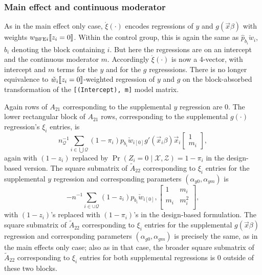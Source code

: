 \documentclass{article}
\DeclarePairedDelimiter{\indicator}{\llbracket}{\rrbracket}
\newcommand{\owt}[1][{[z_{i}]}]{\ensuremath{\check{w}_{i#1}}}
\begin{document}
  \subsubsection{Main effect and continuous moderator}
As in the main effect only case, $\acute{\xi}(\cdot)$ encodes
regressions of $y$ and $g(\vec{x}\beta)$ with weights
$w_{\text{BFE}i}\indicator{z_i=0}$.  Within the control group, this is
again the same as $\hat{p}_{b_i}\owt[]$, $b_i$ denoting the block
containing $i$. But here the regressions are on an
intercept and the continuous moderator $m$. Accordingly
$\acute{\xi}(\cdot)$ is now a 4-vector, with intercept and $m$ terms
for the $y$ and for the $g$ regresssions.  There is no longer
equivalence to $\owt[]\indicator{z_{i}=0}$-weighted regression of $y$
and $g$ on the block-absorbed transformation of the
\texttt{[(Intercept), m]} model matrix.

Again rows of $A_{21}$ corresponding to the supplemental $y$
regression are 0. The lower rectangular block of $A_{21}$ rows,
corresponding to the supplemental $g(\cdot)$ regression's $\xi_{i}$
entries, is
\begin{equation*}
    n_{\mathcal{Q}}^{-1}\sum_{i\in \bigcup\mathcal{Q} }
  (1-\pi_{i}){p}_{b_{{i}}}\owt[{[0]}] g'(\vec{x}_{i}{\beta})
  \vec{x}_{i} \begin{bmatrix}    1 \\ m_{i}  \end{bmatrix}, 
\end{equation*}
again with $(1-z_{i})$ replaced by $\operatorname{Pr}(Z_{i}=0 \mid \mathcal{X}, \mathcal{Z})
= 1-\pi_{i}$ in the design-based version. The square submatrix of
$\tilde{A}_{22}$ corresponding to $\xi_{i}$ entries for the
supplemental $y$ regression and corresponding parameters
$(\alpha_{y0}, \alpha_{y m})$ is
\begin{equation*}
    -n^{-1}\sum_{i \in \cup \mathcal{Q}}
(1-z_{i}){p}_{b_{{i}}}\owt[{[0]}],
\begin{bmatrix}
  1 & m_{i}\\
  m_{i} & m_{i}^{2}\\
\end{bmatrix},
\end{equation*}
with $(1-z_{i})$'s replaced with $(1-\pi_{i})$'s in the design-based
formulation.  The square submatrix of
$\tilde{A}_{22}$ corresponding to $\xi_{i}$ entries for the
supplemental $g(\vec{x}\beta)$ regression and corresponding parameters
$(\alpha_{g0}, \alpha_{g m})$ is precisely the same, as in the main
effects only case; also as in that case, the broader square submatrix of
$\tilde{A}_{22}$ corresponding to $\xi_{i}$ entries for both
supplemental regressions is 0 outside of these two blocks.
\end{document}
